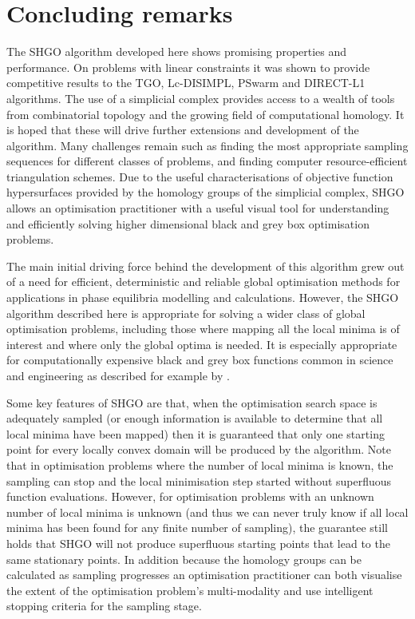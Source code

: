 \chapter{Concluding remarks}
The SHGO algorithm developed here shows promising properties and performance. On problems with linear constraints it was shown to provide competitive results to the TGO, Lc-DISIMPL, PSwarm and DIRECT-L1 algorithms. The use of a simplicial complex provides access to a wealth of tools from combinatorial topology and the growing field of computational homology. It is hoped that these will drive further extensions and development of the algorithm. Many challenges remain such as finding the most appropriate sampling sequences for different classes of problems, and finding computer resource-efficient triangulation schemes. Due to the useful characterisations of objective function hypersurfaces provided by the homology groups of the simplicial complex, SHGO allows an optimisation practitioner with a useful visual tool for understanding and efficiently solving higher dimensional black and grey box optimisation problems.

The main initial driving force behind the development of this algorithm grew out of a need for efficient, deterministic and reliable global optimisation methods for applications in phase equilibria modelling and calculations. However, the SHGO algorithm described here is appropriate for solving a wider class of global optimisation problems, including those where mapping all the local minima is of interest and where only the global optima is needed. It is especially appropriate for computationally expensive black and grey box functions common in science and engineering as described for example by \citet{Shan2010}.
 
Some key features of SHGO are that, when the optimisation search space is adequately sampled (or enough information is available to determine that all local minima have been mapped) then it is guaranteed that only one starting point for every locally convex domain will be produced by the algorithm. Note that in optimisation problems where the number of local minima is known, the sampling can stop and the local minimisation step started without superfluous function evaluations. However, for optimisation problems with an unknown number of local minima is unknown (and thus we can never truly know if all local minima has been found for any finite number of sampling), the guarantee still holds that SHGO will not produce superfluous starting points that lead to the same stationary points. In addition because the homology groups can be calculated as sampling progresses an optimisation practitioner can both visualise the extent of the optimisation problem's multi-modality and use intelligent stopping criteria for the sampling stage.


